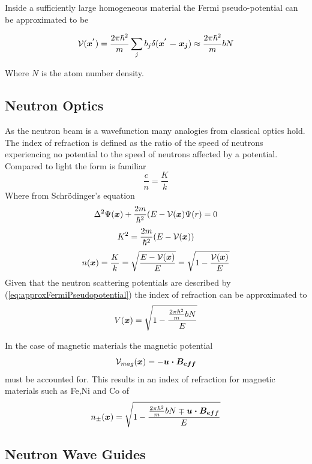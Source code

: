 Inside a sufficiently large homogeneous material the Fermi pseudo-potential can be approximated to be 

\begin{equation}
 \mathcal{V}(\mbox{\boldmath$x^{'}$})  = \frac{2\pi\hbar^2}{m}\sum\limits_{j} b_j \delta(\mbox{\boldmath$x^{'}-x_{j}$}) \approx \frac{2\pi\hbar^2}{m}bN 
\label{eq:approxFermiPseudopotential}
\end{equation}

Where $N$ is the atom number density. 
\subsection{Neutron Optics}
As the neutron beam is a wavefunction many analogies from classical optics hold. The index of refraction is defined as the ratio of the speed of neutrons experiencing no potential to the speed of neutrons affected by a potential. Compared to light the form is familiar 
$$ \frac{c}{n} = \frac{K}{k}$$
Where from Schrödinger's equation
$$\Delta^2\Psi(\mbox{\boldmath$x$}) + \frac{2m}{\hbar^2}(E-\mathcal{V}(\mbox{\boldmath$x$})\Psi(r) = 0 $$ 
\begin{equation}
\label{eq:K}
K^2 = \frac{2m}{\hbar^2}(E-\mathcal{V}(\mbox{\boldmath$x$}))
\end{equation}
\begin{equation}
\label{eq:NinPotential}
n(\mbox{\boldmath$x$}) = \frac{K}{k} = \sqrt{\frac{E-\mathcal{V}(\mbox{\boldmath$x$})}{E}}=\sqrt{1-\frac{\mathcal{V}(\mbox{\boldmath$x$})}{E}}
\end{equation}
Given that the neutron scattering potentials are described by (\ref{eq:approxFermiPseudopotential}) the index of refraction can be approximated to 
\begin{equation}
V(\mbox{\boldmath$x$}) = \sqrt{1-\frac{\frac{2\pi\hbar^2}{m}bN}{E}}
\label{eq:indexofrefraction}
\end{equation}

In the case of magnetic materials the magnetic potential
\begin{equation*}
\mathcal{V}_{mag}(\mbox{\boldmath$x$})=-\mbox{\boldmath$u \cdot B_{eff}$}
\end{equation*}
 must be accounted for. This results in an index of refraction for magnetic materials such as Fe,Ni and Co of 
\begin{equation}
n_{\pm}(\mbox{\boldmath$x$})= \sqrt{1-\frac{\frac{2\pi\hbar^2}{m}bN \mp \mbox{\boldmath$u \cdot B_{eff}$}}{E}}
\label{eq:nucleurIndexofRefraction}
\end{equation}
\subsection{Neutron Wave Guides}

